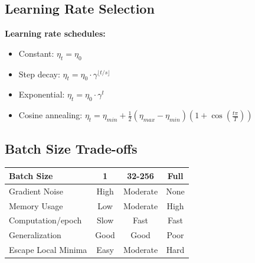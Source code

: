 \documentclass{article}
\begin{document}
\subsection{Learning Rate Selection}

\begin{center}
\end{center}

\textbf{Learning rate schedules:}
\begin{itemize}
\item Constant: $\eta_t = \eta_0$
\item Step decay: $\eta_t = \eta_0 \cdot \gamma^{\lfloor t/s \rfloor}$
\item Exponential: $\eta_t = \eta_0 \cdot \gamma^t$
\item Cosine annealing: $\eta_t = \eta_{min} + \frac{1}{2}(\eta_{max} - \eta_{min})(1 + \cos(\frac{t\pi}{T}))$
\end{itemize}

\subsection{Batch Size Trade-offs}

\begin{center}
\begin{tabular}{|l|c|c|c|}
\hline
\textbf{Batch Size} & \textbf{1} & \textbf{32-256} & \textbf{Full} \\
\hline
Gradient Noise & High & Moderate & None \\
Memory Usage & Low & Moderate & High \\
Computation/epoch & Slow & Fast & Fast \\
Generalization & Good & Good & Poor \\
Escape Local Minima & Easy & Moderate & Hard \\
\hline
\end{tabular}
\end{center}
\end{document}
